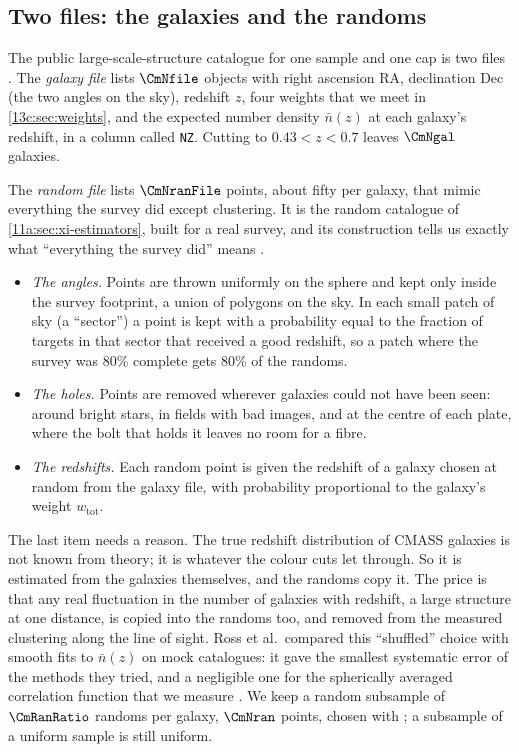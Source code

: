 \subsection{Two files: the galaxies and the randoms}
\label{13c:sec:files}

The public large-scale-structure catalogue for one sample and one cap is two
files \cite{Reid2016}. The \emph{galaxy file} lists $\CmNfile$ objects with
right ascension $\mathrm{RA}$, declination $\mathrm{Dec}$ (the two angles on the
sky), redshift $z$, four weights that we meet in \cref{13c:sec:weights}, and the
expected number density $\bar n(z)$ at each galaxy's redshift, in a column called
\texttt{NZ}. Cutting to $0.43<z<0.7$ leaves $\CmNgal$ galaxies.

The \emph{random file} lists $\CmNranFile$ points, about fifty per galaxy, that
mimic everything the survey did except clustering. It is the random catalogue of
\cref{11a:sec:xi-estimators}, built for a real survey, and its construction tells us
exactly what ``everything the survey did'' means .
\begin{itemize}[itemsep=1pt,leftmargin=1.2em]
  \item \emph{The angles.} Points are thrown uniformly on the sphere and kept only
        inside the survey footprint, a union of polygons on the sky. In each small
        patch of sky (a ``sector'') a point is kept with a probability equal to the
        fraction of targets in that sector that received a good redshift, so a
        patch where the survey was 80\% complete gets 80\% of the randoms.
  \item \emph{The holes.} Points are removed wherever galaxies could not have been
        seen: around bright stars, in fields with bad images, and at the centre
        of each plate, where the bolt that holds it leaves no room for a fibre.
  \item \emph{The redshifts.} Each random point is given the redshift of a galaxy
        chosen at random from the galaxy file, with probability proportional to the
        galaxy's weight $w_{\mathrm{tot}}$.
\end{itemize}
The last item needs a reason. The true redshift distribution of CMASS galaxies is
not known from theory; it is whatever the colour cuts let through. So it is
estimated from the galaxies themselves, and the randoms copy it. The price is that
any real fluctuation in the number of galaxies with redshift, a large structure at
one distance, is copied into the randoms too, and removed from the measured
clustering along the line of sight. Ross et al.\ compared this ``shuffled'' choice with smooth fits to $\bar n(z)$ on
mock catalogues: it gave the smallest systematic error of the methods they tried,
and a negligible one for the spherically averaged correlation function that we
measure \cite{Ross2012}. We keep a random subsample of
$\CmRanRatio$ randoms per galaxy, $\CmNran$ points, chosen with
; a subsample of a uniform sample is still uniform.

